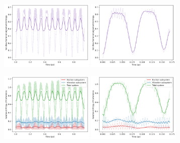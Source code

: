 \documentclass[11pt]{article}
\begin{document}
\begin{figure}[H]
    \begin{subfigure}{\textwidth}
        \centering
        \includegraphics[width=0.49\textwidth]{Research Project/Code/results/ExVib/Closed/Envelope/vne.png}
        \hfill
        \includegraphics[width=0.49\textwidth]{Research Project/Code/results/ExVib/Closed/Fast/vne.png}
        \caption{}
        \label{fig:EVM_CQS_Ent_e0}
    \end{subfigure}

    \vspace{0.8em}

    \begin{subfigure}{\textwidth}
        \centering
        \includegraphics[width=0.49\textwidth]{Research Project/Code/results/ExVib/Closed/Envelope/coh.png}
        \hfill
        \includegraphics[width=0.49\textwidth]{Research Project/Code/results/ExVib/Closed/Fast/coh.png}
        \caption{}
        \label{fig:EVM_CQS_Coh_e0}
    \end{subfigure}


\end{figure}
\end{document}

